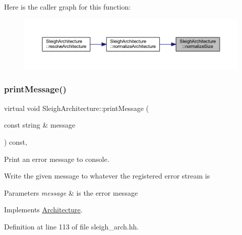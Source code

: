 Here is the caller graph for this function\+:
\nopagebreak
\begin{figure}[H]
\begin{center}
\leavevmode
\includegraphics[width=350pt]{class_sleigh_architecture_a4645a63583ea3f8088e24d6fa71dce50_icgraph}
\end{center}
\end{figure}
\mbox{\label{class_sleigh_architecture_a70cc8c22ebab95cf41ab21b7d886c08f}} 
\subsubsection{\texorpdfstring{printMessage()}{printMessage()}}
{\footnotesize\ttfamily virtual void Sleigh\+Architecture\+::print\+Message (\begin{DoxyParamCaption}\item[{const string \&}]{message }\end{DoxyParamCaption}) const\hspace{0.3cm}{\ttfamily [inline]}, {\ttfamily [virtual]}}



Print an error message to console. 

Write the given message to whatever the registered error stream is 
\begin{DoxyParams}{Parameters}
{\em message} & is the error message \\
\hline
\end{DoxyParams}


Implements \mbox{\hyperlink{class_architecture_a69348906c7601efa002f1f1365decda9}{Architecture}}.



Definition at line 113 of file sleigh\+\_\+arch.\+hh.

